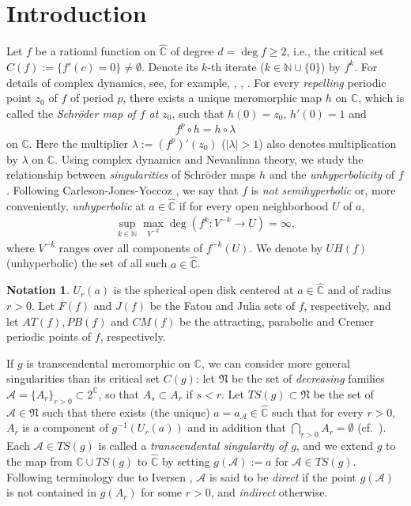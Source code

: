 \documentclass[a4paper,12pt]{amsart}
\theoremstyle{plain}
\theoremstyle{definition}
\newtheorem{notation}[equation]{Notation}
\theoremstyle{remark}
\numberwithin{equation}{section}
\begin{document}
\section{Introduction}\label{sec:intro}
Let $f$ be a rational function on ${\hat{\mathbb{C}}}$
of degree $d=\deg f\ge 2$, i.e., 
the critical set $C(f):=\{f'(c)=0\}\neq\emptyset$.
Denote its $k$-th iterate ($k\in{\mathbb{N}}\cup\{0\}$) by $f^k$.
For details of complex dynamics, see, for example, \cite{Milnor3rd},
\cite{MorosawaTaniguchi}, \cite{Steinmetz93}. 
For every {\itshape repelling} periodic point $z_0$ of $f$
of period $p$, there exists a unique meromorphic map $h$ on ${\mathbb{C}}$,
which is called the {\itshape Schr\"oder map of $f$ at $z_0$},
such that $h(0)=z_0$, $h'(0)=1$ and
\begin{align}
 f^{p}\circ h=h\circ\lambda\label{eq:Schroder}
\end{align}
on ${\mathbb{C}}$. Here the multiplier $\lambda:=(f^p)'(z_0)$ ($|\lambda|>1$)
also denotes multiplication by $\lambda$ on ${\mathbb{C}}$.
Using complex dynamics and Nevanlinna theory, 
we study the relationship between
{\itshape singularities} of Schr\"oder maps $h$
and the {\itshape unhyperbolicity} of $f$. 
Following Carleson-Jones-Yoccoz \cite{CJY94},
we say that $f$ is {\itshape not semihyperbolic} or, more conveniently,
{\itshape unhyperbolic} at $a\in{\hat{\mathbb{C}}}$ if for every open neighborhood $U$ of $a$,
\begin{gather}
 \sup_{k\in{\mathbb{N}}}\max_{V^{-k}}\deg(f^k:V^{-k}\to U)=\infty, \label{eq:unhyp}
\end{gather}
where $V^{-k}$ ranges over all components of $f^{-k}(U)$.
We denote by ${\mathit{UH}}(f)$ (unhyperbolic) the set of all such $a\in{\hat{\mathbb{C}}}$.

\begin{notation}
 $U_r(a)$ is the spherical open disk centered at  $a\in{\hat{\mathbb{C}}}$ and of radius $r>0$.
 Let $F(f)$ and $J(f)$ be the Fatou and Julia sets of $f$, respectively,
 and let ${\mathit{AT}}(f),{\mathit{PB}}(f)$ and ${\mathit{CM}}(f)$ be 
 the attracting, parabolic and Cremer periodic points of $f$, respectively.
\end{notation}

If $g$ is transcendental meromorphic on ${\mathbb{C}}$,
we can consider more general singularities than its critical set $C(g)$:
let $\mathfrak{N}$ be the set of {\itshape decreasing} families
$\mathcal{A}=\{A_r\}_{r>0}\subset 2^{\mathbb{C}}$, so that $A_s\subset A_r$ if $s<r$. 
Let ${\mathit{TS}}(g)\subset\mathfrak{N}$ be the set of
$\mathcal{A}\in\mathfrak{N}$ such that 
there exists (the unique) $a=a_{\mathcal{A}}\in{\hat{\mathbb{C}}}$ such that for every $r>0$,
$A_r$ is a component of $g^{-1}(U_r(a))$ and in addition
that $\bigcap_{r>0}A_r=\emptyset$ (cf.\ \cite{BE95}). 
Each $\mathcal{A}\in{\mathit{TS}}(g)$ is called a {\itshape transcendental singularity of $g$},
and we extend $g$ to the map from ${\mathbb{C}}\cup{\mathit{TS}}(g)$ to ${\hat{\mathbb{C}}}$ by 
setting $g(\mathcal{A}):=a$ for $\mathcal{A}\in{\mathit{TS}}(g)$.
Following terminology due to Iversen \cite{Iversen14}, 
$\mathcal{A}$ is said to be {\itshape direct}
if the point $g(\mathcal{A})$ is not contained in $g(A_r)$ for some $r>0$,
and {\itshape indirect} otherwise.
\end{document}
